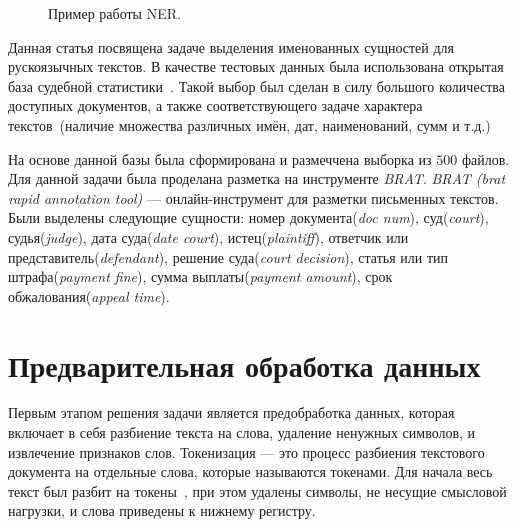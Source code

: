\documentclass{csmathnotes}
\begin{document}
\begin{figure}[h]
    \caption{Пример работы NER.}
    \label{fig:ner}
\end{figure}


Данная статья посвящена задаче выделения именованных сущностей для рускоязычных текстов.
В качестве тестовых данных была использована открытая база судебной статистики~\cite{CourtsData}.
Такой выбор был сделан в силу большого количества доступных документов, а также соответствующего задаче характера текстов~(наличие множества различных имён, дат, наименований, сумм и т.д.)

На основе данной базы была сформирована и размеччена выборка из $500$ файлов.
Для данной задачи была проделана разметка на инструменте \emph{BRAT}. \emph{BRAT (brat rapid annotation tool)} — онлайн-инструмент для разметки письменных текстов. Были выделены следующие сущности: номер документа(\emph{doc num}), суд(\emph{court}), судья(\emph{judge}), дата суда(\emph{date court}), истец(\emph{plaintiff}), ответчик или представитель(\emph{defendant}), решение суда(\emph{court decision}), статья или тип штрафа(\emph{payment fine}), сумма выплаты(\emph{payment amount}), срок обжалования(\emph{appeal time}).


\section*{Предварительная обработка данных}
Первым этапом решения задачи является предобработка данных, которая включает в себя разбиение текста на слова, удаление ненужных символов, и извлечение признаков слов. 
Токенизация — это процесс разбиения текстового документа на отдельные слова, которые называются токенами.
Для начала весь текст был разбит на токены~\cite{Ner}, при этом удалены символы, не несущие смысловой нагрузки, и слова приведены к нижнему регистру.
\end{document}
